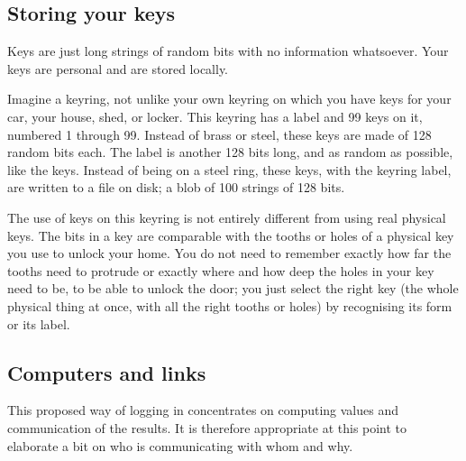 \subsection{Storing your keys}
Keys are just long strings of random bits with no information whatsoever.
Your keys are personal and are stored locally.
\par
Imagine a keyring,
	not unlike your own keyring on which you have keys for your car,
		your house,
			shed,
				or locker.
This keyring has a label and 99 keys on it,
	numbered 1 through 99.
Instead of brass or steel,
	these keys are made of 128 random bits each.
The label is another 128 bits long,
	and as random as possible,
		like the keys.
Instead of being on a steel ring,
	these keys,
		with the keyring label,
			are written to a file on disk;
				a blob of 100 strings of 128 bits.
\par
The use of keys on this keyring is not entirely different from using real physical keys.
The bits in a key are comparable with the tooths or holes of a physical key you use to unlock your home.
You do not need to remember exactly how far the tooths need to protrude or exactly where and how deep the holes in your key need to be,
	to be able to unlock the door;
		you just select the right key
			(the whole physical thing at once, with all the right tooths or holes)
				by recognising its form or its label.

\subsection{Computers and links}
This proposed way of logging in concentrates on computing values and communication of the results.
It is therefore appropriate at this point to elaborate a bit on who is communicating with whom and why.
